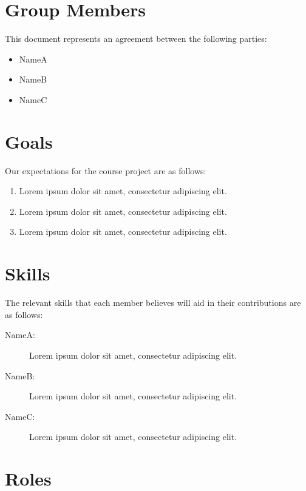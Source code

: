 \documentclass{article}
\newcommand{\groupmember}[1]{#1}
\begin{document}
\section{Group Members} %
\label{par:group_members}
This document represents an agreement between the following parties:
\begin{itemize}
    \item \groupmember{NameA}
    \item \groupmember{NameB}
    \item \groupmember{NameC}
\end{itemize}

\section{Goals} %
\label{par:expectations}
Our expectations for the course project are as follows:
\begin{enumerate}
    \item Lorem ipsum dolor sit amet, consectetur adipiscing elit.
    \item Lorem ipsum dolor sit amet, consectetur adipiscing elit.
    \item Lorem ipsum dolor sit amet, consectetur adipiscing elit.
\end{enumerate}

\section{Skills} %
\label{sec:skills}

The relevant skills that each member believes will aid in their contributions are as follows:

\begin{description}
    \item[\groupmember{NameA}:] Lorem ipsum dolor sit amet, consectetur adipiscing elit.
    \item[\groupmember{NameB}:] Lorem ipsum dolor sit amet, consectetur adipiscing elit.
    \item[\groupmember{NameC}:] Lorem ipsum dolor sit amet, consectetur adipiscing elit.
\end{description}

\section{Roles} %
\label{sec:roles}
\end{document}

